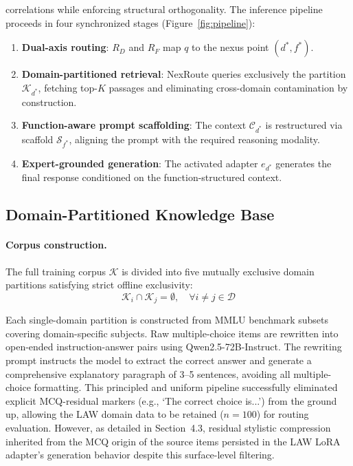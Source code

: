 \documentclass[a4paper,fleql]{cas-sc}
\begin{document}
correlations while enforcing structural orthogonality.
The inference pipeline proceeds in four synchronized stages
(Figure~\ref{fig:pipeline}):
\begin{enumerate}
    \item \textbf{Dual-axis routing}: $R_D$ and $R_F$ map $q$ to the nexus
    point $(d^*, f^*)$.
    \item \textbf{Domain-partitioned retrieval}: NexRoute queries exclusively
    the partition $\mathcal{K}_{d^*}$, fetching top-$K$ passages and
    eliminating cross-domain contamination by construction.
    \item \textbf{Function-aware prompt scaffolding}: The context
    $\mathcal{C}_{d^*}$ is restructured via scaffold $\mathcal{S}_{f^*}$,
    aligning the prompt with the required reasoning modality.
    \item \textbf{Expert-grounded generation}: The activated adapter $e_{d^*}$
    generates the final response conditioned on the function-structured context.
\end{enumerate}
\subsection{Domain-Partitioned Knowledge Base}
\label{ssec:retrieval}
\paragraph{Corpus construction.}
The full training corpus $\mathcal{K}$ is divided into five mutually exclusive
domain partitions satisfying strict offline exclusivity:
\begin{equation}
    \mathcal{K}_i \cap \mathcal{K}_j = \emptyset,
    \quad \forall i \neq j \in \mathcal{D}
    \label{eq:partition}
\end{equation}

Each single-domain partition is constructed from MMLU benchmark subsets
\citep{hendrycks2021mmlu} covering domain-specific subjects. Raw
multiple-choice items are rewritten into open-ended instruction-answer pairs
using Qwen2.5-72B-Instruct. The rewriting prompt instructs the model to
extract the correct answer and generate a comprehensive explanatory paragraph
of 3--5 sentences, avoiding all multiple-choice formatting. This principled and 
uniform pipeline successfully eliminated explicit MCQ-residual markers 
(e.g., `The correct choice is...') from the ground up, allowing the LAW domain 
data to be retained ($n=100$) for routing evaluation. However, as detailed in 
Section~4.3, residual stylistic compression inherited from the MCQ origin of 
the source items persisted in the LAW LoRA adapter's generation behavior 
despite this surface-level filtering.
\end{document}

